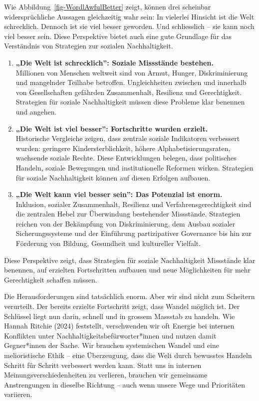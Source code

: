 \documentclass[
  nswissgerman,
  a4paper,
  openany]{book}
\begin{document}
Wie Abbildung~\ref{fig-WordlAwfulBetter} zeigt, können drei scheinbar
widersprüchliche Aussagen gleichzeitig wahr sein: In vielerlei Hinsicht
ist die Welt schrecklich. Dennoch ist sie viel besser geworden. Und
schliesslich -- sie kann noch viel besser sein. Diese Perspektive bietet
auch eine gute Grundlage für das Verständnis von Strategien zur sozialen
Nachhaltigkeit.

\begin{enumerate}
\def\labelenumi{\arabic{enumi}.}
\item
  \textbf{„Die Welt ist schrecklich'': Soziale Missstände bestehen.}\\
  Millionen von Menschen weltweit sind von Armut, Hunger,
  Diskriminierung und mangelnder Teilhabe betroffen. Ungleichheiten
  zwischen und innerhalb von Gesellschaften gefährden Zusammenhalt,
  Resilienz und Gerechtigkeit. Strategien für soziale Nachhaltigkeit
  müssen diese Probleme klar benennen und angehen.
\item
  \textbf{„Die Welt ist viel besser'': Fortschritte wurden erzielt.}\\
  Historische Vergleiche zeigen, dass zentrale soziale Indikatoren
  verbessert wurden: geringere Kindersterblichkeit, höhere
  Alphabetisierungsraten, wachsende soziale Rechte. Diese Entwicklungen
  belegen, dass politisches Handeln, soziale Bewegungen und
  institutionelle Reformen wirken. Strategien für soziale Nachhaltigkeit
  können auf diesen Erfolgen aufbauen.
\item
  \textbf{„Die Welt kann viel besser sein'': Das Potenzial ist enorm.}\\
  Inklusion, sozialer Zusammenhalt, Resilienz und
  Verfahrensgerechtigkeit sind die zentralen Hebel zur Überwindung
  bestehender Missstände. Strategien reichen von der Bekämpfung von
  Diskriminierung, dem Ausbau sozialer Sicherungssysteme und der
  Einführung partizipativer Governance bis hin zur Förderung von
  Bildung, Gesundheit und kultureller Vielfalt.
\end{enumerate}

Diese Perspektive zeigt, dass Strategien für soziale Nachhaltigkeit
Missstände klar benennen, auf erzielten Fortschritten aufbauen und neue
Möglichkeiten für mehr Gerechtigkeit schaffen müssen.

Die Herausforderungen sind tatsächlich enorm. Aber wir sind nicht zum
Scheitern verurteilt. Der bereits erzielte Fortschritt zeigt, dass
Wandel möglich ist. Der Schlüssel liegt nun darin, schnell und in
grossem Massstab zu handeln. Wie Hannah Ritchie (2024) feststellt,
verschwenden wir oft Energie bei internen Konflikten unter
Nachhaltigkeitsbefürworter*innen und nutzen damit Gegner*innen der
Sache. Wir brauchen systemischen Wandel und eine melioristische Ethik --
eine Überzeugung, dass die Welt durch bewusstes Handeln Schritt für
Schritt verbessert werden kann. Statt uns in internen
Meinungsverschiedenheiten zu verlieren, brauchen wir gemeinsame
Anstrengungen in dieselbe Richtung -- auch wenn unsere Wege und
Prioritäten variieren.
\end{document}
